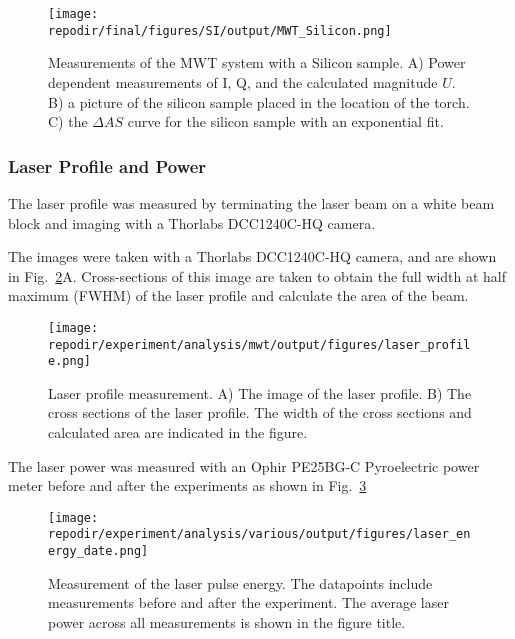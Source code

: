 \begin{figure}[]
\centering
\texttt{[image: \\repodir/final/figures/SI/output/MWT\_Silicon.png]}
\caption{Measurements of the MWT system with a Silicon sample. A) Power dependent measurements of I, Q, and the calculated magnitude $U$. B) a picture of the silicon sample placed in the location of the torch. C) the $\Delta AS$ curve for the silicon sample with an exponential fit. }
\label{fig:SI_MWT_Silicon}
\end{figure}








\clearpage
\subsubsection{Laser Profile and Power}

The laser profile was measured by terminating the laser beam on a white beam block and imaging with a Thorlabs DCC1240C-HQ camera. %

The images were taken with a Thorlabs DCC1240C-HQ camera, and are shown in Fig.\ \ref{fig:SI_Laser_Profile}A. Cross-sections of this image are taken to obtain the full width at half maximum (FWHM) of the laser profile and calculate the area of the beam. 

\begin{figure}[H]
\centering
\texttt{[image: \\repodir/experiment/analysis/mwt/output/figures/laser\_profile.png]}
\caption{Laser profile measurement. A) The image of the laser profile. B) The cross sections of the laser profile. The width of the cross sections and calculated area are indicated in the figure.}
\label{fig:SI_Laser_Profile}
\end{figure}


The laser power was measured with an Ophir PE25BG-C Pyroelectric power meter before and after the experiments as shown in Fig.\ \ref{fig:SI_Laser_Energy} 



\begin{figure}[H]
\centering
\texttt{[image: \\repodir/experiment/analysis/various/output/figures/laser\_energy\_date.png]}
\caption{Measurement of the laser pulse energy. The datapoints include measurements before and after the experiment. The average laser power across all measurements is shown in the figure title. }
\label{fig:SI_Laser_Energy}
\end{figure}


